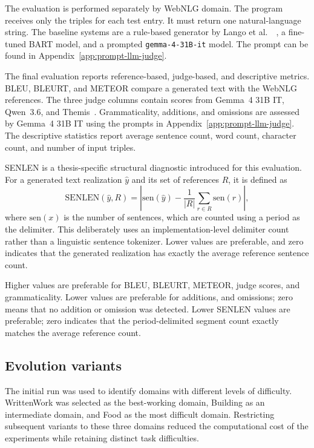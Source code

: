 The evaluation is performed separately by WebNLG domain. The program receives
only the triples for each test entry. It must return one natural-language
string. The baseline systems are a rule-based generator by Lango et al.~~\cite{lango-dusek-2025-llm}, a fine-tuned BART
model, and a prompted \texttt{gemma-4-31B-it} model. The prompt can be found in
Appendix~\ref{app:prompt-llm-judge}.

The final evaluation reports reference-based, judge-based, and descriptive
metrics. BLEU, BLEURT, and METEOR compare a generated text with the WebNLG
references. The three judge columns contain scores from Gemma~4 31B IT,
Qwen~3.6, and Themis~\cite{hu2024themis}. Grammaticality, additions, and
omissions are assessed by Gemma~4 31B IT using the prompts in
Appendix~\ref{app:prompt-llm-judge}. The descriptive statistics report average
sentence count, word count, character count, and number of input triples.

SENLEN is a thesis-specific structural diagnostic introduced for this
evaluation. For a generated text realization
$\hat{y}$ and its set of references $R$, it is defined as
\[
\mathrm{SENLEN}(\hat{y}, R) =
\left|\mathrm{sen}(\hat{y}) -
\frac{1}{|R|}\sum_{r \in R}\mathrm{sen}(r)\right|,
\]
where $\mathrm{sen}(x)$ is the number of sentences, which are counted using
a period as the delimiter. This deliberately
uses an implementation-level delimiter count rather than a linguistic sentence
tokenizer. Lower values are preferable, and zero indicates
that the generated realization has exactly the average reference sentence count.

Higher values are preferable for BLEU, BLEURT, METEOR, judge scores, and
grammaticality. Lower values are preferable for additions, and
omissions; zero means that no addition or
omission was detected. Lower SENLEN values are preferable; zero indicates that
the period-delimited segment count exactly matches the average reference count.

\subsection{Evolution variants}

The initial run was used to identify domains with different levels of
difficulty. WrittenWork was selected as the best-working domain, Building as
an intermediate domain, and Food as the most difficult domain. Restricting
subsequent variants to these three domains reduced the computational cost
of the experiments while retaining distinct task difficulties.

